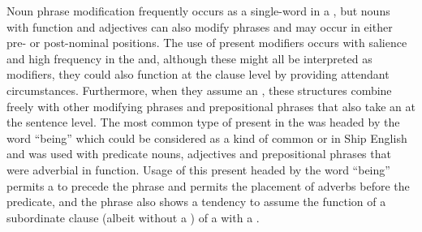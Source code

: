 Noun phrase modification frequently occurs as a single-word  in a , but nouns with  function and  adjectives can also modify  phrases and may occur in either pre- or post-nominal positions. The use of present  modifiers occurs with salience and high frequency in the  and, although these might all be interpreted as  modifiers, they could also function at the clause level by providing attendant circumstances. Furthermore, when they assume an , these  structures combine freely with other modifying  phrases and prepositional phrases that also take an  at the sentence level. The most common type of present  in the  was headed by the word “being” which could be considered as a kind of common  or  in Ship English and was used with predicate nouns, adjectives and prepositional phrases that were adverbial in function. Usage of this present  headed by the word “being” permits a   to precede the phrase and permits the placement of adverbs before the predicate, and the phrase also shows a tendency to assume the function of a subordinate clause (albeit without a ) of a  with a . 

